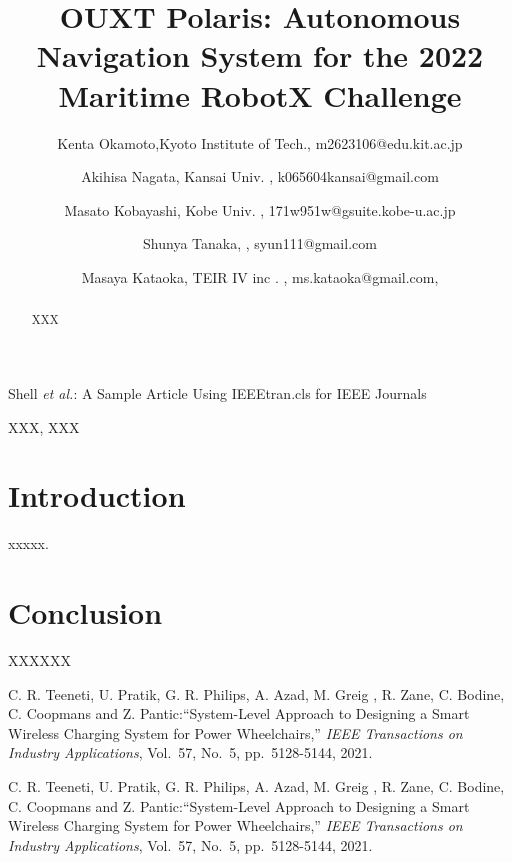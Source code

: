 \documentclass[lettersize,journal]{IEEEtran}
\begin{document}
\title{OUXT Polaris: Autonomous Navigation System for the 2022 Maritime RobotX Challenge}
\author{
    Kenta Okamoto,Kyoto Institute of Tech., m2623106@edu.kit.ac.jp \\ \and
    Akihisa Nagata, Kansai Univ. , k065604kansai@gmail.com \\ \and
    Masato Kobayashi, Kobe Univ. , 171w951w@gsuite.kobe-u.ac.jp \\ \and
    Shunya Tanaka, , syun111@gmail.com \\ \and
    Masaya Kataoka, TEIR IV inc . , ms.kataoka@gmail.com,
}

%
{Shell \MakeLowercase{\textit{et al.}}: A Sample Article Using IEEEtran.cls for IEEE Journals}


\maketitle

\begin{abstract}
XXX
\end{abstract}

\begin{IEEEkeywords}
XXX, XXX
\end{IEEEkeywords}

\section{Introduction}
 xxxxx.

\section{Conclusion}
XXXXXX
\begin{thebibliography}{1}


    C. R. Teeneti, U. Pratik, G. R. Philips, A. Azad, M. Greig , R. Zane, C. Bodine, C. Coopmans and Z. Pantic:``System-Level Approach to Designing a Smart Wireless Charging System for Power Wheelchairs,'' {\it IEEE Transactions on Industry Applications}, Vol.~57, No.~5, pp.~5128-5144, 2021.

    C. R. Teeneti, U. Pratik, G. R. Philips, A. Azad, M. Greig , R. Zane, C. Bodine, C. Coopmans and Z. Pantic:``System-Level Approach to Designing a Smart Wireless Charging System for Power Wheelchairs,'' {\it IEEE Transactions on Industry Applications}, Vol.~57, No.~5, pp.~5128-5144, 2021.

\end{thebibliography}

\vfill
\end{document}
